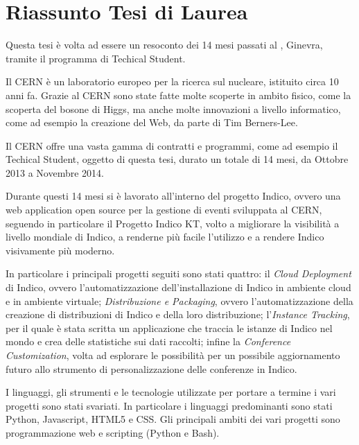         {\let\clearpage\relax
            \chapter*{Riassunto Tesi di Laurea}
                Questa tesi è volta ad essere un resoconto dei 14 mesi passati al , Ginevra, tramite il programma di Techical Student.
                
                Il \ac{CERN} è un laboratorio europeo per la ricerca sul nucleare, istituito circa 10 anni fa. Grazie al \ac{CERN} sono state fatte molte scoperte in ambito fisico, come la scoperta del bosone di Higgs, ma anche molte innovazioni a livello informatico, come ad esempio la creazione del Web, da parte di Tim Berners-Lee.
                
                Il \ac{CERN} offre una vasta gamma di contratti e programmi, come ad esempio il Techical Student, oggetto di questa tesi, durato un totale di 14 mesi, da Ottobre 2013 a Novembre 2014.
                
                Durante questi 14 mesi si è lavorato all'interno del progetto Indico, ovvero una web application open source per la gestione di eventi sviluppata al \ac{CERN}, seguendo in particolare il Progetto Indico KT, volto a migliorare la visibilità a livello mondiale di Indico, a renderne più facile l'utilizzo e a rendere Indico visivamente più moderno.
                
                In particolare i principali progetti seguiti sono stati quattro: il \textit{Cloud Deployment} di Indico, ovvero l'automatizzazione dell'installazione di Indico in ambiente cloud e in ambiente virtuale; \textit{Distribuzione e Packaging}, ovvero l'automatizzazione della creazione di distribuzioni di Indico e della loro distribuzione; l'\textit{Instance Tracking}, per il quale è stata scritta un applicazione che traccia le istanze di Indico nel mondo e crea delle statistiche sui dati raccolti; infine la \textit{Conference Customization}, volta ad esplorare le possibilità per un possibile aggiornamento futuro allo strumento di personalizzazione delle conferenze in Indico.
                
                I linguaggi, gli strumenti e le tecnologie utilizzate per portare a termine i vari progetti sono stati svariati. In particolare i linguaggi predominanti sono stati Python, Javascript, HTML5 e CSS. Gli principali ambiti dei vari progetti sono programmazione web e scripting (Python e Bash).
        }
